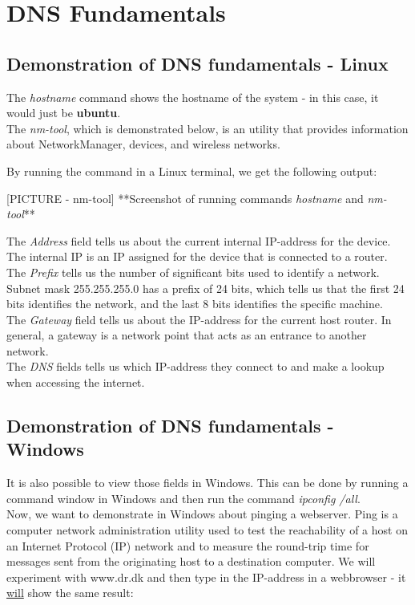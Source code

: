 \section{DNS Fundamentals}
\subsection{Demonstration of DNS fundamentals - Linux}

The \textit{hostname} command shows the hostname of the system - in this case, it would just be \textbf{ubuntu}.\\

The \textit{nm-tool}, which is demonstrated below, is an utility that provides information about NetworkManager, devices, and wireless networks. 

By running the command in a Linux terminal, we get the following output:

[PICTURE - nm-tool]
**Screenshot of running commands \textit{hostname} and \textit{nm-tool}**

The \textit{Address} field tells us about the current internal IP-address for the device. The internal IP is an IP assigned for the device that is connected to a router. \\

The \textit{Prefix} tells us the number of significant bits used to identify a network. Subnet mask 255.255.255.0 has a prefix of 24 bits, which tells us that the first 24 bits identifies the network, and the last 8 bits identifies the specific machine. \\

The \textit{Gateway} field tells us about the IP-address for the current host router. In general, a gateway is a network point that acts as an entrance to another network. \\

The \textit{DNS} fields tells us which IP-address they connect to and make a lookup when accessing the internet. 

\subsection{Demonstration of DNS fundamentals - Windows}

It is also possible to view those fields in Windows. This can be done by running a command window in Windows and then run the command \textit{ipconfig /all}. \\

Now, we want to demonstrate in Windows about pinging a webserver. Ping is a computer network administration utility used to test the reachability of a host on an Internet Protocol (IP) network and to measure the round-trip time for messages sent from the originating host to a destination computer. 
We will experiment with www.dr.dk and then type in the IP-address in a webbrowser - it \underline{will} show the same result:

